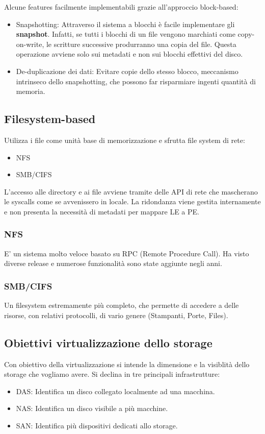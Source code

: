 \documentclass{article}
\begin{document}
		Alcune features facilmente implementabili grazie all'approccio block-based:
		\begin{itemize}
		    \item Snapshotting: Attraverso il sistema a blocchi è facile implementare gli \textbf{snapshot}. Infatti, se tutti i blocchi di un file vengono marchiati come copy-on-write, le scritture successive produrranno una copia del file. Questa operazione avviene solo sui metadati e non sui blocchi effettivi del disco.
		    \item De-duplicazione dei dati: Evitare copie dello stesso blocco, meccanismo intrinseco dello snapshotting, che possono far risparmiare ingenti quantità di memoria.
		\end{itemize}
		
		\subsection{Filesystem-based}
		Utilizza i file come unità base di memorizzazione e sfrutta file system di rete:
		\begin{itemize}
		    \item NFS
		    \item SMB/CIFS
		\end{itemize}
		L'accesso alle directory e ai file avviene tramite delle API di rete che mascherano le syscalls come se avvenissero in locale. La ridondanza viene gestita internamente e non presenta la necessità di metadati per mappare LE a PE.
		
		\subsubsection{NFS}
		E' un sistema molto veloce basato su RPC (Remote Procedure Call). Ha visto diverse release e numerose funzionalità sono state aggiunte negli anni.
		
		\subsubsection{SMB/CIFS}
		Un filesystem estremamente più completo, che permette di accedere a delle risorse, con relativi protocolli, di vario genere (Stampanti, Porte, Files).
		
		\subsection{Obiettivi virtualizzazione dello storage}
		Con obiettivo della virtualizzazione si intende la dimensione e la visiblità dello storage che vogliamo avere. Si declina in tre principali infrastrutture:
		\begin{itemize}
		    \item DAS: Identifica un disco collegato localmente ad una macchina.
		    \item NAS: Identifica un disco visibile a più macchine.
		    \item SAN: Identifica più dispositivi dedicati allo storage.
		\end{itemize}
\end{document}
